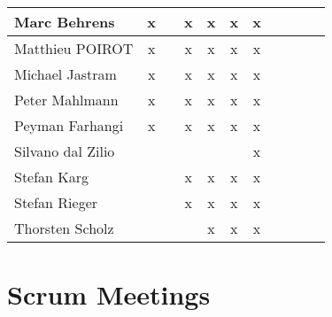 \documentclass[a4paper, 11pt]{article}
\begin{document}
\begin{tabular}{|l|c|c|c|c||c|c|c||c|c|c|}
Marc Behrens         & x &   & x & x & x & x &  \\\hline
Matthieu POIROT       & x  &   & x  & x & x & x &   \\\hline
Michael Jastram      & x &   & x & x & x & x &   \\\hline
Peter Mahlmann       & x &   & x & x & x & x &  \\\hline
Peyman Farhangi      & x  &   & x & x & x & x &   \\\hline
Silvano dal Zilio    &   &   &   &  &  & x &  \\\hline
Stefan Karg          &   &   & x  & x & x & x &  \\\hline
Stefan Rieger        &   &  & x & x & x & x &  \\\hline
Thorsten Scholz      &   &   &  & x & x & x &  \\\hline
\end{tabular}


\section{Scrum Meetings}
\end{document}
